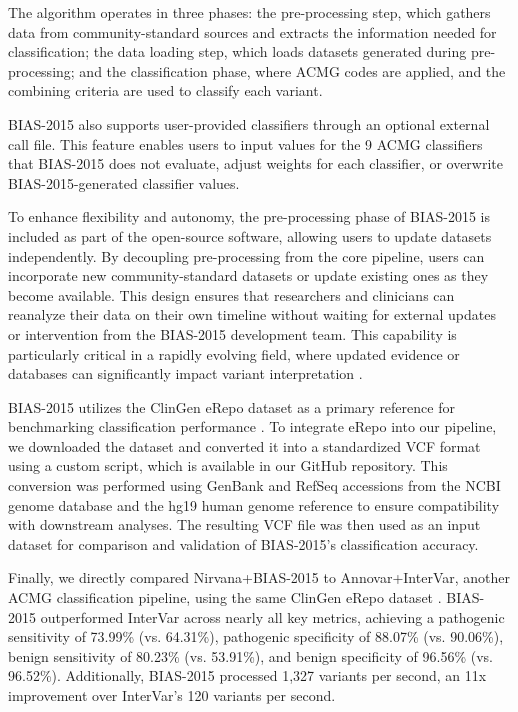 \documentclass[unnumsec,webpdf,contemporary,large]{oup-authoring-template}
\theoremstyle{thmstyleone}
\theoremstyle{thmstyletwo}
\theoremstyle{thmstylethree}
\begin{document}
The algorithm operates in three phases: the pre-processing step, which gathers data from community-standard sources and extracts the information needed for classification; the data loading step, which loads datasets generated during pre-processing; and the classification phase, where ACMG codes are applied, and the combining criteria are used to classify each variant.

BIAS-2015 also supports user-provided classifiers through an optional external call file. This feature enables users to input values for the 9 ACMG classifiers that BIAS-2015 does not evaluate, adjust weights for each classifier, or overwrite BIAS-2015-generated classifier values.

To enhance flexibility and autonomy, the pre-processing phase of BIAS-2015 is included as part of the open-source software, allowing users to update datasets independently. By decoupling pre-processing from the core pipeline, users can incorporate new community-standard datasets or update existing ones as they become available. This design ensures that researchers and clinicians can reanalyze their data on their own timeline without waiting for external updates or intervention from the BIAS-2015 development team. This capability is particularly critical in a rapidly evolving field, where updated evidence or databases can significantly impact variant interpretation \cite{elmecky2019variant_reclassification}.

BIAS-2015 utilizes the ClinGen eRepo dataset as a primary reference for benchmarking classification performance \cite{clingen_erepo}. To integrate eRepo into our pipeline, we downloaded the dataset and converted it into a standardized VCF format using a custom script, which is available in our GitHub repository. This conversion was performed using GenBank and RefSeq accessions from the NCBI genome database \cite{genbank_refseq} and the hg19 human genome reference to ensure compatibility with downstream analyses. The resulting VCF file was then used as an input dataset for comparison and validation of BIAS-2015's classification accuracy.

Finally, we directly compared Nirvana+BIAS-2015 to Annovar+InterVar, another ACMG classification pipeline, using the same ClinGen eRepo dataset \cite{wang2010annovar, li2017intervar}. BIAS-2015 outperformed InterVar across nearly all key metrics, achieving a pathogenic sensitivity of 73.99\% (vs. 64.31\%), pathogenic specificity of 88.07\% (vs. 90.06\%), benign sensitivity of 80.23\% (vs. 53.91\%), and benign specificity of 96.56\% (vs. 96.52\%). Additionally, BIAS-2015 processed 1,327 variants per second, an 11x improvement over InterVar’s 120 variants per second.
\end{document}
